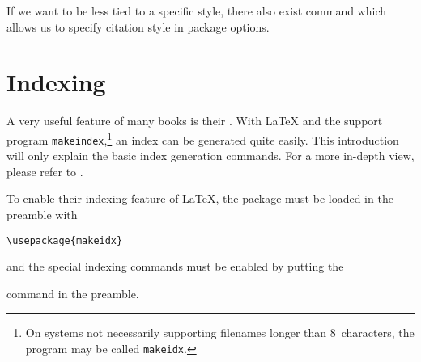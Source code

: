 If we want to be less tied to a specific style, there also exist 
command which allows us to specify citation style in package options.




\section{Indexing} \label{sec:indexing}
A very useful feature of many books is their . With \LaTeX{}
and the support program \texttt{makeindex},\footnote{On systems not
  necessarily supporting
  filenames longer than 8~characters, the program may be called
  \texttt{makeidx}.} an index can be generated quite easily.  This
introduction will only explain the basic index generation commands.
For a more in-depth view, please refer to \companion.   

To enable their indexing feature of \LaTeX{}, the  package
must be loaded in the preamble with
\begin{lscommand}
\verb|\usepackage{makeidx}|
\end{lscommand}
\noindent and the special indexing commands must be enabled by putting
the
\begin{lscommand}
\end{lscommand}
\noindent command in the preamble.

